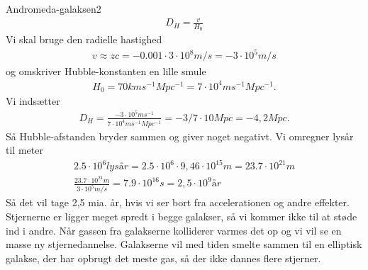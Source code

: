 \begin{opgave}{Andromeda-galaksen}{2}
	\opg 
	\begin{align}
		D_H=\frac{v}{H_0} 
	\end{align}
	Vi skal bruge den radielle hastighed
	\begin{align}
		v \approx z c = -0.001 \cdot 3\cdot 10^8 m/s =-3\cdot 10^5 m/s
	\end{align}
	og omskriver Hubble-konstanten en lille smule
	\begin{align}
		H_0=70 km s^{-1} Mpc^{-1} = 7 \cdot 10^4 m s^{-1} Mpc^{-1}.
	\end{align}
	Vi indsætter
	\begin{align}
	D_H=\frac{-3\cdot 10^5 m s^{-1}} {7 \cdot 10^4 m s^{-1} Mpc^{-1}} = - 3/7 \cdot 10 Mpc = - 4,2 Mpc.
	\end{align}
	Så Hubble-afstanden bryder sammen og giver noget negativt.
	\opg Vi omregner lysår til meter
	\begin{align}
		2.5\cdot 10^6 lysår = 2.5\cdot 10^6 \cdot 9,46 \cdot 10^15 m = 23.7 \cdot 10^21 m\\
		\frac{23.7 \cdot 10^21 m}{3\cdot 10^5 m/s} = 7.9 \cdot 10^16 s = 2,5 \cdot 10^9 år
	\end{align} 
	Så det vil tage 2,5 mia. år, hvis vi ser bort fra accelerationen og andre effekter.
	Stjernerne er ligger meget spredt i begge galakser, så vi kommer ikke til at støde ind i andre. Når gassen fra galakserne kolliderer varmes det op og vi vil se en masse ny stjernedannelse. Galakserne vil med tiden smelte sammen til en elliptisk galakse, der har opbrugt det meste gas, så der ikke dannes flere stjerner. 
\end{opgave}